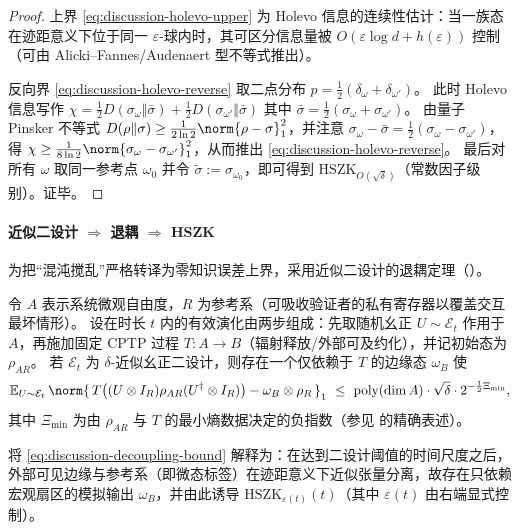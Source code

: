 \begin{proof}
上界 \eqref{eq:discussion-holevo-upper} 为 Holevo 信息的连续性估计：当一族态在迹距意义下位于同一 \(\varepsilon\)-球内时，其可区分信息量被 \(O(\varepsilon\log d+h(\varepsilon))\) 控制（可由 Alicki--Fannes/Audenaert 型不等式推出）。
\par
反向界 \eqref{eq:discussion-holevo-reverse} 取二点分布 \(p=\frac12(\delta_\omega+\delta_{\omega'})\)。
此时 Holevo 信息写作
\(
\chi=\frac12 D(\sigma_\omega\Vert \bar\sigma)+\frac12 D(\sigma_{\omega'}\Vert \bar\sigma)
\)
其中 \(\bar\sigma=\frac12(\sigma_\omega+\sigma_{\omega'})\)。
由量子 Pinsker 不等式 \(D(\rho\Vert\sigma)\ge \frac{1}{2\ln 2}\norm{\rho-\sigma}_1^2\)，并注意
\(\sigma_\omega-\bar\sigma=\frac12(\sigma_\omega-\sigma_{\omega'})\)，得
\(
\chi\ge \frac{1}{8\ln 2}\norm{\sigma_\omega-\sigma_{\omega'}}_1^2
\)，从而推出 \eqref{eq:discussion-holevo-reverse}。
最后对所有 \(\omega\) 取同一参考点 \(\omega_0\) 并令 \(\widetilde{\sigma}:=\sigma_{\omega_0}\)，即可得到 \(\mathrm{HSZK}_{O(\sqrt\delta)}\)（常数因子级别）。证毕。
\end{proof}

\paragraph{近似二设计 \texorpdfstring{$\Rightarrow$}{=>} 退耦 \texorpdfstring{$\Rightarrow$}{=>} HSZK}
为把“混沌搅乱”严格转译为零知识误差上界，采用近似二设计的退耦定理（\cite{SzehrDupuisTomamichelRenner2013DecouplingTwoDesigns}）。

\begin{theorem}\label{thm:discussion-2design-decoupling-hszk}
令 \(A\) 表示系统微观自由度，\(R\) 为参考系（可吸收验证者的私有寄存器以覆盖交互最坏情形）。
设在时长 \(t\) 内的有效演化由两步组成：先取随机幺正 \(U\sim\mathcal{E}_t\) 作用于 \(A\)，再施加固定 CPTP 过程 \(T:A\to B\)（辐射释放/外部可及约化），并记初始态为 \(\rho_{AR}\)。
若 \(\mathcal{E}_t\) 为 \(\delta\)-近似幺正二设计，则存在一个仅依赖于 \(T\) 的边缘态 \(\omega_B\) 使
\begin{equation}\label{eq:discussion-decoupling-bound}
\mathbb{E}_{U\sim\mathcal{E}_t}\,
\norm{\,T\bigl((U\otimes I_R)\rho_{AR}(U^\dagger\otimes I_R)\bigr)-\omega_B\otimes\rho_R\,}_1
\ \le\
\mathrm{poly}(\dim A)\cdot \sqrt{\delta}\cdot 2^{-\frac12\Xi_{\min}},
\end{equation}
其中 \(\Xi_{\min}\) 为由 \(\rho_{AR}\) 与 \(T\) 的最小熵数据决定的负指数（参见 \cite{SzehrDupuisTomamichelRenner2013DecouplingTwoDesigns} 的精确表述）。
\par
将 \eqref{eq:discussion-decoupling-bound} 解释为：在达到二设计阈值的时间尺度之后，外部可见边缘与参考系（即微态标签）在迹距意义下近似张量分离，故存在只依赖宏观扇区的模拟输出 \(\omega_B\)，并由此诱导 \(\mathrm{HSZK}_{\varepsilon(t)}(t)\)（其中 \(\varepsilon(t)\) 由右端显式控制）。
\end{theorem}

